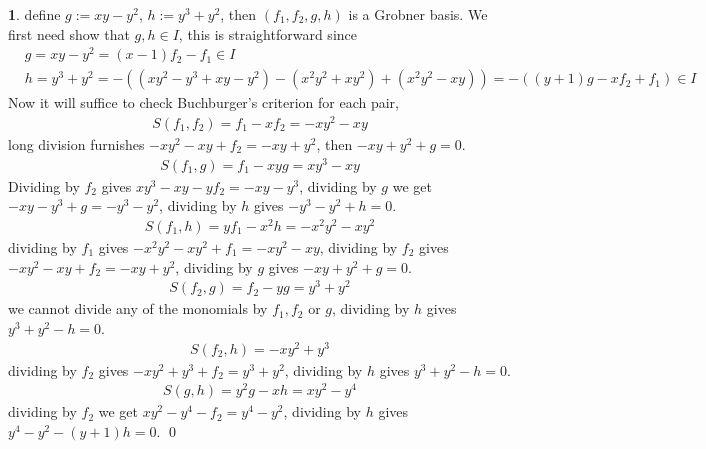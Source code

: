\documentclass[11pt]{article}
\theoremstyle{definition}
\newtheorem{pb}{}
\newcommand{\tor}{\text{ or }}
\begin{document}
    \begin{pb}
        define \(g := xy-y^2\), \(h := y^3 + y^2\), then \((f_1,f_2,g,h)\) is a Grobner basis.  We first need show that \(g,h \in I\), this is straightforward since
        \begin{align*}
            &g = xy-y^2 = (x-1)f_2 - f_1  \in I\\
            &h = y^3 + y^2 = -((xy^2 - y^3 + xy - y^2) - (x^2y^2 + xy^2) + (x^2y^2 - xy)) =  -((y+1)g - xf_2 + f_1) \in I
        \end{align*}
        Now it will suffice to check Buchburger's criterion for each pair,
        \begin{align*}
            S(f_1,f_2) = f_1 - xf_2 = -xy^2 - xy 
        \end{align*}
        long division furnishes  \(-xy^2 - xy + f_2 = -xy+y^2\), then \(-xy+y^2 + g = 0\).
        \begin{align*}
            S(f_1,g) = f_1 - xyg = xy^3 - xy
        \end{align*}
        Dividing by \(f_2\) gives \(xy^3 - xy - yf_2 = -xy - y^3\), dividing by \(g\) we get \(-xy - y^3 + g = -y^3 - y^2\), dividing by \(h\) gives \(-y^3 - y^2 + h = 0\).
        \begin{align*}
            S(f_1,h) = yf_1 - x^2h = -x^2y^2 - xy^2
        \end{align*}
        dividing by \(f_1\) gives \(-x^2y^2 - xy^2 + f_1 = -xy^2 - xy\), dividing by \(f_2\) gives \(-xy^2 - xy + f_2 = -xy + y^2\), dividing by \(g\) gives \(-xy + y^2 + g = 0\).
        \begin{align*}
            S(f_2,g) = f_2 - yg = y^3 + y^2
        \end{align*}
        we cannot divide any of the monomials by \(f_1,f_2 \tor g\), dividing by \(h\) gives \(y^3 + y^2 - h = 0\).
        \begin{align*}
            S(f_2,h) = -xy^2 + y^3
        \end{align*}
        dividing by \(f_2\) gives \(-xy^2 + y^3 + f_2 = y^3 + y^2\), dividing by \(h\) gives \(y^3 + y^2 - h = 0\).
        \begin{align*}
            S(g,h) = y^2g - xh = xy^2 - y^4
        \end{align*}
        dividing by \(f_2\) we get \(xy^2 - y^4 - f_2 = y^4 - y^2\), dividing by \(h\) gives \(y^4 - y^2 - (y + 1)h = 0\). \qed
    \end{pb}
\end{document}
